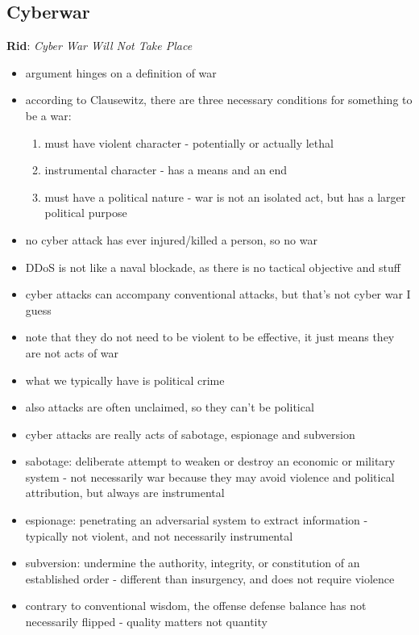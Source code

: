 \documentclass{article}
\begin{document}
\subsection*{Cyberwar}
\textbf{Rid}: \textit{Cyber War Will Not Take Place}
\begin{itemize}
    \item argument hinges on a definition of war
    \item according to Clausewitz, there are three necessary conditions for something to be a war:
    \begin{enumerate}
        \item must have violent character - potentially or actually lethal
        \item instrumental character - has a means and an end
        \item must have a political nature - war is not an isolated act, but has a larger political purpose
    \end{enumerate}
    \item no cyber attack has ever injured/killed a person, so no war
    \item DDoS is not like a naval blockade, as there is no tactical objective and stuff
    \item cyber attacks can accompany conventional attacks, but that's not cyber war I guess
    \item note that they do not need to be violent to be effective, it just means they are not acts of war
    \item what we typically have is political crime
    \item also attacks are often unclaimed, so they can't be political
    \item cyber attacks are really acts of sabotage, espionage and subversion
    \item sabotage: deliberate attempt to weaken or destroy an economic or military system - not necessarily war because they may avoid violence and political attribution, but always are instrumental
    \item espionage: penetrating an adversarial system to extract information - typically not violent, and not necessarily instrumental
    \item subversion: undermine the authority, integrity, or constitution of an established order - different than insurgency, and does not require violence
    \item contrary to conventional wisdom, the offense defense balance has not necessarily flipped - quality matters not quantity
\end{itemize}
\end{document}
